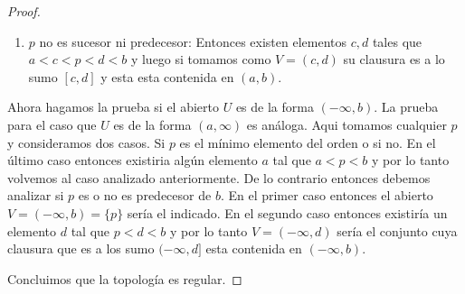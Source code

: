 \documentclass[paper=letter, fontsize=11pt]{scrartcl} %
\numberwithin{equation}{section} %
\numberwithin{figure}{section} %
\numberwithin{table}{section} %
\begin{document}
\begin{enumerate}
\begin{proof}
\begin{enumerate}
\item $ p $ no es sucesor ni predecesor: Entonces existen elementos $ c,d $ tales que $ a<c<p<d<b $ y luego si tomamos como $ V = (c,d) $ su clausura es a lo sumo $ [c,d] $ y esta esta contenida en $ (a,b) $.
\end{enumerate}

Ahora hagamos la prueba si el abierto $ U $ es de la forma $ (-\infty,b)  $. La prueba para el caso que $ U $ es de la forma $ (a,\infty) $ es análoga. Aqui tomamos cualquier $ p $ y consideramos dos casos. Si $ p $ es el mínimo elemento del orden o si no. En el último caso entonces existiria algún elemento $ a $ tal que $ a < p < b $ y por lo tanto volvemos al caso analizado anteriormente. 
De lo contrario entonces debemos analizar si $ p $ es o no es predecesor de $ b $. En el primer caso entonces el abierto $ V = (-\infty,b) = \{p\} $ sería el indicado. En el segundo caso entonces existiría un elemento $ d $ tal que $ p<d<b $ y por lo tanto  $ V = (-\infty,d) $ sería el conjunto cuya clausura que es a los sumo $ (-\infty,d] $ esta contenida en $ (-\infty,b) $.

Concluimos que la topología es regular.
\end{proof}
\end{enumerate}
\end{document}
